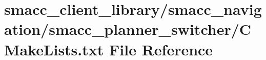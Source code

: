 \hypertarget{smacc__client__library_2smacc__navigation_2smacc__planner__switcher_2CMakeLists_8txt}{}\section{smacc\+\_\+client\+\_\+library/smacc\+\_\+navigation/smacc\+\_\+planner\+\_\+switcher/\+C\+Make\+Lists.txt File Reference}
\label{smacc__client__library_2smacc__navigation_2smacc__planner__switcher_2CMakeLists_8txt}
